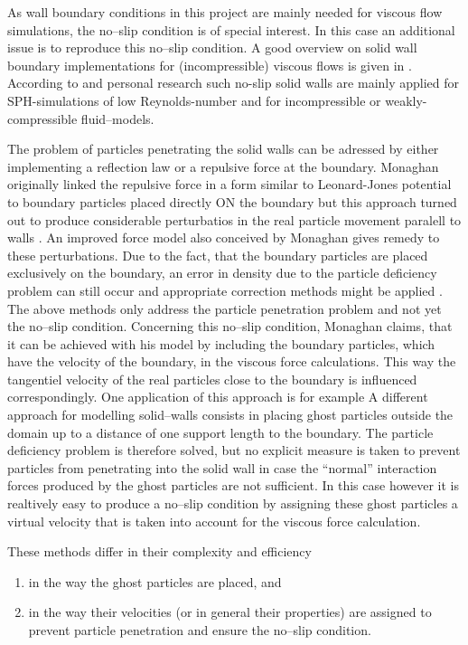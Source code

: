 \documentclass{report}
\begin{document}
As wall boundary conditions in this project are mainly needed for viscous flow simulations, the no--slip condition is of special interest. In this case an additional issue is to reproduce this no--slip condition. A good overview on solid wall boundary implementations for (incompressible) viscous flows is given in \cite{Yildiz2009}. 
According to \cite{Yildiz2009} and personal research such no-slip solid walls are mainly applied for SPH-simulations of low Reynolds-number and for incompressible or weakly-compressible fluid--models. 

The problem of particles penetrating the solid walls can be adressed by either implementing a reflection law or a repulsive force at the boundary. Monaghan originally linked the repulsive force in a form similar to Leonard-Jones potential to boundary particles placed directly ON the boundary \cite{Monaghan1994} but this approach turned out to produce considerable perturbatios in the real particle movement paralell to walls \cite{Monaghan2005}. An improved  force model also conceived by Monaghan \cite{Monaghan2003} gives remedy to these perturbations. Due to the fact, that the boundary particles are placed exclusively on the boundary, an error in density due to the particle deficiency problem can still occur and appropriate correction methods might be applied \cite{Monaghan2003}. The above methods only address the particle penetration problem and not yet the no--slip condition. Concerning this no--slip condition, Monaghan claims, that it can be achieved with his model by including the boundary particles, which have the velocity of the boundary, in the viscous force calculations. This way the tangentiel velocity of the real particles close to the boundary is influenced correspondingly. One application of this approach is for example \cite{Cleary2002} 
\linebreak[2]
A different approach for modelling solid--walls consists in placing ghost particles outside the domain up to a distance of one support length to the boundary. The particle deficiency problem is therefore solved, but no explicit measure is taken to prevent particles from penetrating into the solid wall in case the ``normal'' interaction forces produced by the ghost particles are not sufficient. In this case however it is realtively easy to produce a no--slip condition by assigning these ghost particles a virtual velocity that is taken into account for the viscous force calculation.

 These methods differ in their complexity and efficiency 
\begin{enumerate}
  \item in the way the ghost particles are placed, and
\item in the way their velocities (or in general their properties) are assigned to prevent particle penetration and ensure the no--slip condition.
 \end{enumerate}
\end{document}
